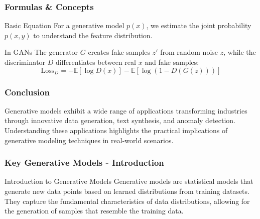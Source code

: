 \documentclass[aspectratio=169]{beamer}
\begin{document}
\begin{frame}[fragile]
    \frametitle{Formulas \& Concepts}
    \begin{block}{Basic Equation}
        For a generative model \( p(x) \), we estimate the joint probability \( p(x, y) \) to understand the feature distribution.
    \end{block}

    \begin{block}{In GANs}
        The generator \( G \) creates fake samples \( z' \) from random noise \( z \), while the discriminator \( D \) differentiates between real \( x \) and fake samples:
        \begin{equation}
            \text{Loss}_D = -\mathbb{E}[\log D(x)] - \mathbb{E}[\log(1 - D(G(z)))]
        \end{equation}
    \end{block}
\end{frame}

\begin{frame}[fragile]
    \frametitle{Conclusion}
    Generative models exhibit a wide range of applications transforming industries through innovative data generation, text synthesis, and anomaly detection. Understanding these applications highlights the practical implications of generative modeling techniques in real-world scenarios.
\end{frame}

\begin{frame}[fragile]
    \frametitle{Key Generative Models - Introduction}
    \begin{block}{Introduction to Generative Models}
        Generative models are statistical models that generate new data points based on learned distributions from training datasets. They capture the fundamental characteristics of data distributions, allowing for the generation of samples that resemble the training data.
    \end{block}
\end{frame}
\end{document}
